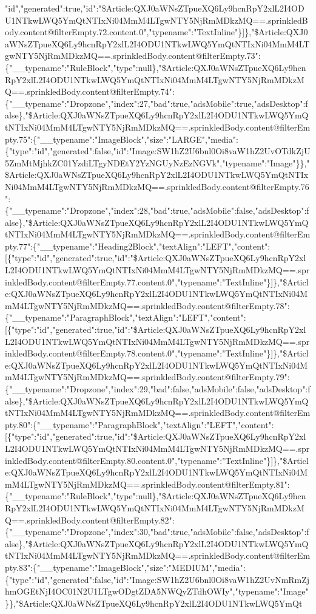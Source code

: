 "id","generated":true,"id":"\$Article:QXJ0aWNsZTpueXQ6Ly9hcnRpY2xlL2I4ODU1NTkwLWQ5YmQtNTIxNi04MmM4LTgwNTY5NjRmMDkzMQ==.sprinkledBody.content@filterEmpty.72.content.0","typename":"TextInline"\}{]}\},"\$Article:QXJ0aWNsZTpueXQ6Ly9hcnRpY2xlL2I4ODU1NTkwLWQ5YmQtNTIxNi04MmM4LTgwNTY5NjRmMDkzMQ==.sprinkledBody.content@filterEmpty.73":\{"\_\_typename":"RuleBlock","type":null\},"\$Article:QXJ0aWNsZTpueXQ6Ly9hcnRpY2xlL2I4ODU1NTkwLWQ5YmQtNTIxNi04MmM4LTgwNTY5NjRmMDkzMQ==.sprinkledBody.content@filterEmpty.74":\{"\_\_typename":"Dropzone","index":27,"bad":true,"adsMobile":true,"adsDesktop":false\},"\$Article:QXJ0aWNsZTpueXQ6Ly9hcnRpY2xlL2I4ODU1NTkwLWQ5YmQtNTIxNi04MmM4LTgwNTY5NjRmMDkzMQ==.sprinkledBody.content@filterEmpty.75":\{"\_\_typename":"ImageBlock","size":"LARGE","media":\{"type":"id","generated":false,"id":"Image:SW1hZ2U6bnl0Oi8vaW1hZ2UvOTdkZjU5ZmMtMjhkZC01YzdiLTgyNDEtY2YzNGUyNzEzNGVk","typename":"Image"\}\},"\$Article:QXJ0aWNsZTpueXQ6Ly9hcnRpY2xlL2I4ODU1NTkwLWQ5YmQtNTIxNi04MmM4LTgwNTY5NjRmMDkzMQ==.sprinkledBody.content@filterEmpty.76":\{"\_\_typename":"Dropzone","index":28,"bad":true,"adsMobile":false,"adsDesktop":false\},"\$Article:QXJ0aWNsZTpueXQ6Ly9hcnRpY2xlL2I4ODU1NTkwLWQ5YmQtNTIxNi04MmM4LTgwNTY5NjRmMDkzMQ==.sprinkledBody.content@filterEmpty.77":\{"\_\_typename":"Heading2Block","textAlign":"LEFT","content":{[}\{"type":"id","generated":true,"id":"\$Article:QXJ0aWNsZTpueXQ6Ly9hcnRpY2xlL2I4ODU1NTkwLWQ5YmQtNTIxNi04MmM4LTgwNTY5NjRmMDkzMQ==.sprinkledBody.content@filterEmpty.77.content.0","typename":"TextInline"\}{]}\},"\$Article:QXJ0aWNsZTpueXQ6Ly9hcnRpY2xlL2I4ODU1NTkwLWQ5YmQtNTIxNi04MmM4LTgwNTY5NjRmMDkzMQ==.sprinkledBody.content@filterEmpty.78":\{"\_\_typename":"ParagraphBlock","textAlign":"LEFT","content":{[}\{"type":"id","generated":true,"id":"\$Article:QXJ0aWNsZTpueXQ6Ly9hcnRpY2xlL2I4ODU1NTkwLWQ5YmQtNTIxNi04MmM4LTgwNTY5NjRmMDkzMQ==.sprinkledBody.content@filterEmpty.78.content.0","typename":"TextInline"\}{]}\},"\$Article:QXJ0aWNsZTpueXQ6Ly9hcnRpY2xlL2I4ODU1NTkwLWQ5YmQtNTIxNi04MmM4LTgwNTY5NjRmMDkzMQ==.sprinkledBody.content@filterEmpty.79":\{"\_\_typename":"Dropzone","index":29,"bad":false,"adsMobile":false,"adsDesktop":false\},"\$Article:QXJ0aWNsZTpueXQ6Ly9hcnRpY2xlL2I4ODU1NTkwLWQ5YmQtNTIxNi04MmM4LTgwNTY5NjRmMDkzMQ==.sprinkledBody.content@filterEmpty.80":\{"\_\_typename":"ParagraphBlock","textAlign":"LEFT","content":{[}\{"type":"id","generated":true,"id":"\$Article:QXJ0aWNsZTpueXQ6Ly9hcnRpY2xlL2I4ODU1NTkwLWQ5YmQtNTIxNi04MmM4LTgwNTY5NjRmMDkzMQ==.sprinkledBody.content@filterEmpty.80.content.0","typename":"TextInline"\}{]}\},"\$Article:QXJ0aWNsZTpueXQ6Ly9hcnRpY2xlL2I4ODU1NTkwLWQ5YmQtNTIxNi04MmM4LTgwNTY5NjRmMDkzMQ==.sprinkledBody.content@filterEmpty.81":\{"\_\_typename":"RuleBlock","type":null\},"\$Article:QXJ0aWNsZTpueXQ6Ly9hcnRpY2xlL2I4ODU1NTkwLWQ5YmQtNTIxNi04MmM4LTgwNTY5NjRmMDkzMQ==.sprinkledBody.content@filterEmpty.82":\{"\_\_typename":"Dropzone","index":30,"bad":true,"adsMobile":false,"adsDesktop":false\},"\$Article:QXJ0aWNsZTpueXQ6Ly9hcnRpY2xlL2I4ODU1NTkwLWQ5YmQtNTIxNi04MmM4LTgwNTY5NjRmMDkzMQ==.sprinkledBody.content@filterEmpty.83":\{"\_\_typename":"ImageBlock","size":"MEDIUM","media":\{"type":"id","generated":false,"id":"Image:SW1hZ2U6bnl0Oi8vaW1hZ2UvNmRmZjhmOGEtNjI4OC01N2U1LTgwODgtZDA5NWQyZTdhOWIy","typename":"Image"\}\},"\$Article:QXJ0aWNsZTpueXQ6Ly9hcnRpY2xlL2I4ODU1NTkwLWQ5YmQt